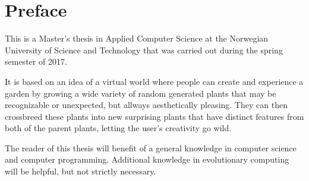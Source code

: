\hypersetup{pageanchor=false}
%

\chapter*{Preface}
This is a Master's thesis in Applied Computer Science at the Norwegian University of Science and Technology that was carried out during the spring semester of 2017.

It is based on an idea of a virtual world where people can create and experience a garden by growing a wide variety of random generated plants that may be recognizable or unexpected, but allways aesthetically pleasing.
They can then crossbreed these plants into new surprising plants that have distinct features from both of the parent plants, letting the user's creativity go wild.

The reader of this thesis will benefit of a general knowledge in computer science and computer programming.
Additional knowledge in evolutionary computing will be helpful, but not strictly necessary.

\thesisdate \\[1pc]
\\[1pc]
